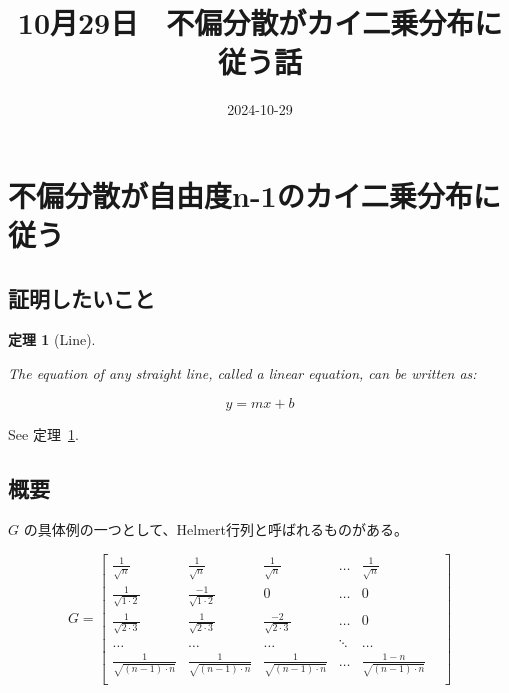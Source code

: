 \documentclass[
  letterpaper,
  DIV=11,
  numbers=noendperiod]{scrartcl}
\title{10月29日　不偏分散がカイ二乗分布に従う話}
\author{}
\date{2024-10-29}
\renewcommand*\contentsname{目次}
\newcommand\contentsname{目次}
\theoremstyle{plain}
\newtheorem{theorem}{定理}[section]
\theoremstyle{remark}
\begin{document}
\maketitle

\renewcommand*\contentsname{目次}
{
\hypersetup{linkcolor=}
\setcounter{tocdepth}{3}
\tableofcontents
}

\section{不偏分散が自由度n-1のカイ二乗分布に従う}\label{ux4e0dux504fux5206ux6563ux304cux81eaux7531ux5ea6n-1ux306eux30abux30a4ux4e8cux4e57ux5206ux5e03ux306bux5f93ux3046}

\subsection{証明したいこと}\label{ux8a3cux660eux3057ux305fux3044ux3053ux3068}

\begin{theorem}[Line]\protect\hypertarget{thm-line}{}\label{thm-line}

The equation of any straight line, called a linear equation, can be
written as:

\[
y = mx + b
\]

\end{theorem}

See 定理~\ref{thm-line}.

\subsection{概要}\label{ux6982ux8981}

\(G\) の具体例の一つとして、Helmert行列と呼ばれるものがある。

\[
G=
\begin{bmatrix}
  \frac{1}{\sqrt{n}} & \frac{1}{\sqrt{n}} &\frac{1}{\sqrt{n}} &\dots &\frac{1}{\sqrt{n}}\\
   \frac{1}{\sqrt{1 \cdot 2}} & \frac{-1}{\sqrt{1 \cdot 2}}& 0 & \dots & 0\\
\frac{1}{\sqrt{2 \cdot 3}} & \frac{1}{\sqrt{2 \cdot 3}}& \frac{-2}{\sqrt{2 \cdot 3}}& \dots & 0\\
\dots &\dots&\dots& \ddots &\dots\\
\frac{1}{\sqrt{(n-1) \cdot n}}& \frac{1}{\sqrt{(n-1) \cdot n}}& 
\frac{1}{\sqrt{(n-1) \cdot n}}& \dots & \frac{1-n}{\sqrt{(n-1) \cdot n}}& \\
\end{bmatrix}
\]
\end{document}
